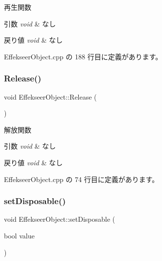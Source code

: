 再生関数 


\begin{DoxyParams}{引数}
{\em void} & なし \\
\hline
\end{DoxyParams}

\begin{DoxyRetVals}{戻り値}
{\em void} & なし \\
\hline
\end{DoxyRetVals}


 Effekseer\+Object.\+cpp の 188 行目に定義があります。

\mbox{\label{class_effekseer_object_a8d5a00238954a2368bbf870dfa8908f7}} 
\subsubsection{\texorpdfstring{Release()}{Release()}}
{\footnotesize\ttfamily void Effekseer\+Object\+::\+Release (\begin{DoxyParamCaption}{ }\end{DoxyParamCaption})}



解放関数 


\begin{DoxyParams}{引数}
{\em void} & なし \\
\hline
\end{DoxyParams}

\begin{DoxyRetVals}{戻り値}
{\em void} & なし \\
\hline
\end{DoxyRetVals}


 Effekseer\+Object.\+cpp の 74 行目に定義があります。

\mbox{\label{class_effekseer_object_ae109ced0206affab5d002a218d3c825c}} 
\subsubsection{\texorpdfstring{set\+Disposable()}{setDisposable()}}
{\footnotesize\ttfamily void Effekseer\+Object\+::set\+Disposable (\begin{DoxyParamCaption}\item[{bool}]{value }\end{DoxyParamCaption})}



